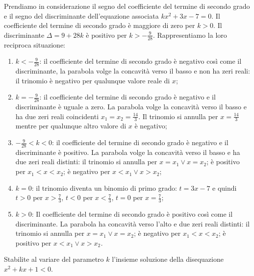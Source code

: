 \begin{exrig}
\begin{esempio}
Prendiamo in considerazione il segno del coefficiente del termine di secondo grado e il segno del discriminante dell'equazione associata $kx^2+3x-7=0$. Il coefficiente del termine di secondo grado è maggiore di zero per $k>0$. Il discriminante $\Delta =9+28k$ è positivo per $k>-\frac 9{28}$. Rappresentiamo la loro reciproca situazione:
\begin{center}
 
\end{center}
\begin{enumerate}[label=(\Alph*)]
\item $k<-\frac 9{28}$: il coefficiente del termine di secondo grado è negativo così come il discriminante, la parabola volge la concavità verso il basso e non ha zeri reali: il trinomio è negativo per qualunque valore reale di $x$;
\item $k=-\frac 9{28}$: il coefficiente del termine di secondo grado è negativo e il discriminante è uguale a zero. La parabola volge la concavità verso il basso e ha due zeri reali coincidenti $x_1=x_2=\frac{14} 3$. Il trinomio si annulla per $x=\frac{14} 3$ mentre per qualunque altro valore di $x$ è negativo;
\item $-\frac 9{28}<k<0$: il coefficiente del termine di secondo grado è negativo e il discriminante è positivo. La parabola volge la concavità verso il basso e ha due zeri reali distinti: il trinomio si annulla per $x=x_1\vee x=x_2$; è positivo per $x_1<x<x_2$; è negativo per $x<x_1\vee x>x_2$;
\item $k=0$: il trinomio diventa un binomio di primo grado: $t=3x-7$ e quindi $t>0$ per $x>\frac 7 3$, $t<0$ per $x<\frac 7 3$, $t=0$ per $x=\frac 7 3$;
\item $k>0$: Il coefficiente del termine di secondo grado è positivo così come il discriminante. La parabola ha concavità verso l'alto e due zeri reali distinti: il trinomio si annulla per $x=x_1\vee x=x_2$; è negativo per $x_1<x<x_2$; è positivo per $x<x_1\vee x>x_2$\emph{.}
\end{enumerate}
\end{esempio}
\pagebreak
\begin{esempio}
Stabilite al variare del parametro $k$ l'insieme soluzione della disequazione $x^2+kx+1<0$.


\end{esempio}
\end{exrig}
